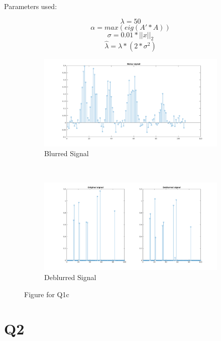 \documentclass{article}
\begin{document}
Parameters used:

$$\lambda = 50$$
$$\alpha = max(eig(A'*A))$$
$$\sigma = 0.01 * ||x||_2$$
$$\hat{\lambda} = \lambda * (2 * \sigma^2)$$
\begin{figure}[H]
  \begin{subfigure}[H]{0.5\textwidth}
    \includegraphics[scale=0.4]{images/blurred_signal_with_noise}
    \caption{Blurred Signal}
    \label{Fig: 1a}
  \end{subfigure}\\
  \begin{subfigure}[H]{0.5\textwidth}
    \includegraphics[scale=0.4]{images/original_and_deblurred_comparison}
    \caption{Deblurred Signal}
    \label{Fig: 1b}
  \end{subfigure}
  \caption{Figure for Q1c}
\end{figure}
\pagebreak
\section*{Q2}
\end{document}
